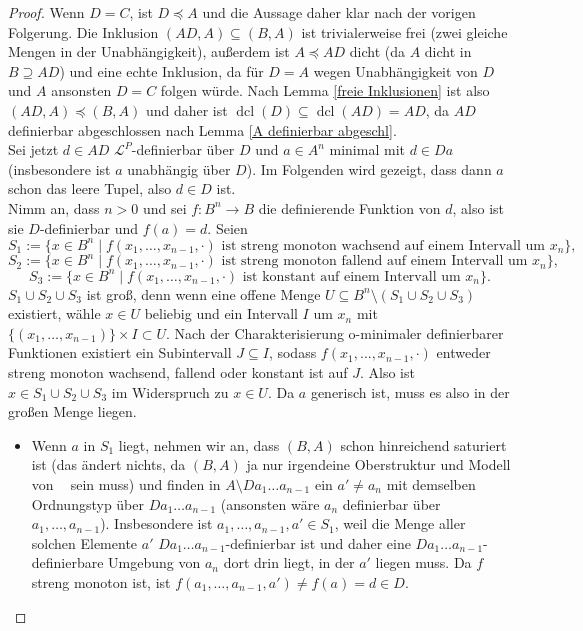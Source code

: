 \documentclass[a4paper, 11pt]{report}
\newcommand{\lingua}{\mathcal{L}}
\DeclareMathOperator{\dcl}{dcl}
\DeclareMathOperator{\td}{T^d}
\theoremstyle{definition}
\begin{document}
\begin{proof}
	Wenn $D=C$, ist $D\preceq A$ und die Aussage daher klar nach der vorigen Folgerung. Die Inklusion $(AD,A)\subseteq(B,A)$ ist trivialerweise frei (zwei gleiche Mengen in der Unabhängigkeit), außerdem ist $A\preceq AD$ dicht (da $A$ dicht in $B\supseteq AD$) und eine echte Inklusion, da für $D=A$ wegen Unabhängigkeit von $D$ und $A$ ansonsten $D=C$ folgen würde. Nach Lemma \ref{freie Inklusionen} ist also $(AD,A)\preceq(B,A)$ und daher ist $\dcl(D)\subseteq\dcl(AD)=AD$, da $AD$ definierbar abgeschlossen nach Lemma \ref{A definierbar abgeschl}.\\
	Sei jetzt $d\in AD$ $\lingua^P$-definierbar über $D$ und $a\in A^n$ minimal mit $d\in Da$ (insbesondere ist $a$ unabhängig über $D$). Im Folgenden wird gezeigt, dass dann $a$ schon das leere Tupel, also $d\in D$ ist.\\
	Nimm an, dass $n>0$ und sei $f:B^n\rightarrow B$ die definierende Funktion von $d$, also ist sie $D$-definierbar und $f(a)=d$. Seien $$S_1:=\{x\in B^n\mid f(x_1,\dots,x_{n-1},\cdot)\text{ ist streng monoton wachsend auf einem Intervall um }x_n\},$$ $$S_2:=\{x\in B^n\mid f(x_1,\dots,x_{n-1},\cdot)\text{ ist streng monoton fallend auf einem Intervall um }x_n\},$$ $$S_3:=\{x\in B^n\mid f(x_1,\dots,x_{n-1},\cdot)\text{ ist konstant auf einem Intervall um }x_n\}.$$
	$S_1\cup S_2\cup S_3$ ist groß, denn wenn eine offene Menge $U\subseteq B^n\setminus(S_1\cup S_2\cup S_3)$ existiert, wähle $x\in U$ beliebig und ein Intervall $I$ um $x_n$ mit $\{(x_1,\dots,x_{n-1})\}\times I\subset U$. Nach der Charakterisierung o-minimaler definierbarer Funktionen existiert ein Subintervall $J\subseteq I$, sodass $f(x_1,\dots,x_{n-1},\cdot)$ entweder streng monoton wachsend, fallend oder konstant ist auf $J$. Also ist $x\in S_1\cup S_2\cup S_3$ im Widerspruch zu $x\in U$.\newpage
	Da $a$ generisch ist, muss es also in der großen Menge liegen.
	\begin{itemize}
		\item Wenn $a$ in $S_1$ liegt, nehmen wir an, dass $(B,A)$ schon hinreichend saturiert ist (das ändert nichts, da $(B,A)$ ja nur irgendeine Oberstruktur und Modell von $\td$ sein muss) und finden in $A\setminus Da_1\dots a_{n-1}$ ein $a'\neq a_n$ mit demselben Ordnungstyp über $Da_1\dots a_{n-1}$ (ansonsten wäre $a_n$ definierbar über $a_1,\dots,a_{n-1}$). Insbesondere ist $a_1,\dots,a_{n-1},a'\in S_1$, weil die Menge aller solchen Elemente $a'$ $Da_1\dots a_{n-1}$-definierbar ist und daher eine $Da_1\dots a_{n-1}$-definierbare Umgebung von $a_n$ dort drin liegt, in der $a'$ liegen muss. Da $f$ streng monoton ist, ist $f(a_1,\dots,a_{n-1},a')\neq f(a)=d\in D$.\\

\end{itemize}
\end{proof}
\end{document}

